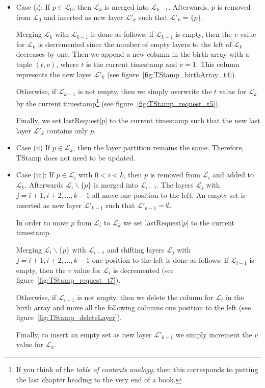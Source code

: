 \documentclass[a4paper,12pt, titlepage]{article}  %
\newcommand{\cl}{\mathcal{L}}   %
\begin{document}
\begin{itemize}
   \item Case (i): If $p \in \cl_0$, then $\cl_k$ is merged into $\cl_{k-1}$. Afterwards, $p$ is removed from
    $\cl_0$ and inserted as new layer $\cl'_k$ such that $\cl'_k=\{p\}$.
        
	Merging $\cl_k$ with $\cl_{k-1}$ is done as follows: 
        if $\cl_{k-1}$ is empty, then the $v$ value for $\cl_{k}$ is decremented since the number of empty layers to the left of $\cl_k$ 
        decreases by one. Then we append a new column in the birth array with a tuple $(t,v)$, where $t$ is the current timestamp
        and $v=1$. This column represents the new layer $\cl'_k$ (see figure~\ref{fig:TStamp_birthArray_t4}).
  
	Otherwise, if $\cl_{k-1}$ is not empty, then we simply overwrite the $t$ value for $\cl_{k}$ by the current
        timestamp\footnote{
	If you think of the \emph{table of contents analogy}, then this corresponds to putting the last chapter heading to the very end of a book.}
        (see figure~\ref{fig:TStamp_request_t5}).

        Finally, we set lastRequest[$p$] to the current timestamp such that the new last layer $\cl'_k$ contains only $p$.          
   \item Case (ii) If $p \in \cl_k$, then the layer partition remains the same. Therefore, TStamp does not need to be updated.
   \item Case (iii): If $p \in \cl_i$ with $0<i<k$, then $p$ is removed from $\cl_i$ and added to $\cl_k$.
            Afterwards $\cl_i \backslash \{p\}$ is merged into $\cl_{i-1}$. The layers $\cl_j$ with $j=i+1,i+2,\dots,k-1$ all move one position to the left. 
           An empty set is inserted as new layer $\cl'_{k-1}$ such that $\cl'_{k-1}=\emptyset$.

           In order to move $p$ from $\cl_i$ to $\cl_k$ we set lastRequest[$p$] to the current timestamp. 

	Merging $\cl_i \backslash \{p\}$ with 
           $\cl_{i-1}$ and shifting layers $\cl_j$ with $j=i+1,i+2,\dots,k-1$ one position to the left is done as follows: if $\cl_{i-1}$ is empty, 
           then the $v$ value for $\cl_i$ is decremented (see figure~\ref{fig:TStamp_request_t7}). 
	   
	   Otherwise, if $\cl_{i-1}$ is not empty, then we delete the column for $\cl_i$ in the birth array and move all the following columns 
           one position to the left (see figure~\ref{fig:TStamp_deleteLayer}). 

	   Finally, to insert an empty set as new layer $\cl'_{k-1}$ we simply increment the $v$ value for $\cl_k$. 	

\end{itemize} 
\end{document}
